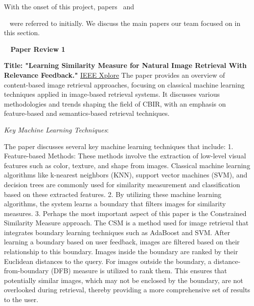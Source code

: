 \documentclass[a4paper]{article}
\theoremstyle{plain}
\theoremstyle{definition}
\begin{document}
\noindent With the onset of this project, papers{~\cite{belhi2020cnn} and}{~\cite{datta2008image}  were referred to initially. We discuss the main papers our team focused on in this section.\newline
\noindent 

\noindent\textbf{~\cite{guo2002learning} Paper Review 1}\newline

\noindent\textbf{Title: "Learning Similarity Measure for Natural Image Retrieval With Relevance Feedback."}
\newline
\href {https://ieeexplore.ieee.org/stamp/stamp.jsp?tp=&arnumber=1021882&tag=1}{IEEE Xplore} \newline
The paper provides an overview of content-based image retrieval approaches, focusing on classical
machine learning techniques applied in image-based retrieval systems. It discusses various
methodologies and trends shaping the field of CBIR, with an emphasis on feature-based and semantics-based retrieval techniques. \newline

\noindent \textit {Key Machine Learning Techniques}:
\newline

The paper discusses several key machine learning techniques that include:
1. Feature-based Methods: These methods involve the extraction of low-level visual features such as color, texture, and shape from images. Classical machine learning algorithms like k-nearest neighbors (KNN), support vector machines (SVM), and decision trees are commonly used
for similarity measurement and classification based on these extracted features.
2. By utilizing these machine learning algorithms, the system learns a boundary that filters
images for similarity measures.
3. Perhaps the most important aspect of this paper is the Constrained Similarity Measure approach. The CSM is a method used for image retrieval that integrates boundary learning techniques such as AdaBoost and SVM. After learning a boundary based on user feedback, images
are filtered based on their relationship to this boundary. Images inside the boundary are ranked by their Euclidean distances to the query. For images outside the boundary, a distance-from-boundary (DFB) measure is utilized to rank them. This ensures that potentially similar images, which may not be enclosed by the boundary, are not overlooked during retrieval, thereby providing a more comprehensive set of results to the user. \newline

}
\end{document}
